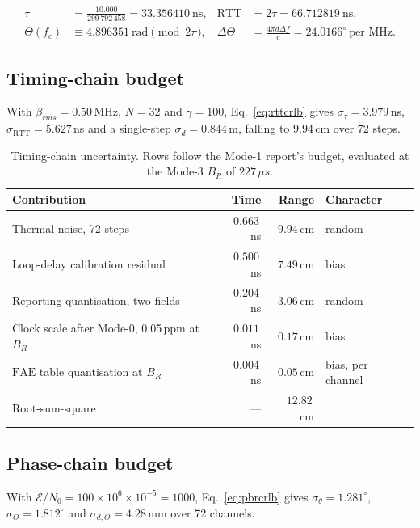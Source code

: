 \documentclass[11pt,a4paper]{article}
\newcommand{\us}{\,\ensuremath{\upmu}s}
\newcommand{\FAE}{\mathrm{FAE}}
\newcommand{\RTT}{\mathrm{RTT}}
\providecommand{\upmu}{\mu}
\begin{document}
\begin{align}
\tau &= \frac{10.000}{299\,792\,458} = 33.356410\ \text{ns}, &
\RTT &= 2\tau = 66.712819\ \text{ns}, \\
\Theta(f_c) &\equiv 4.896351\ \text{rad} \pmod{2\pi}, &
\Delta\Theta &= \frac{4\pi d \Delta f}{c} = 24.0166^{\circ}\ \text{per MHz}.
\end{align}

\subsection{Timing-chain budget}

With $\beta_{rms}=0.50$\,MHz, $N=32$ and $\gamma=100$, Eq.~\eqref{eq:rttcrlb} gives
$\sigma_\tau = 3.979$\,ns, $\sigma_{\RTT}=5.627$\,ns and a single-step $\sigma_d = 0.844$\,m,
falling to $9.94$\,cm over 72 steps.

\begin{table}[h]
\caption{Timing-chain uncertainty. Rows follow the Mode-1 report's budget, evaluated at the Mode-3
$B_R$ of $227\us$.}
\label{tab:budgetrtt}
\centering\small
\begin{tabular}{@{}L{54mm}rrL{26mm}@{}}
\toprule
Contribution & Time & Range & Character \\
\midrule
Thermal noise, 72 steps            & $0.663$\,ns & $9.94$\,cm & random \\
Loop-delay calibration residual    & $0.500$\,ns & $7.49$\,cm & bias \\
Reporting quantisation, two fields & $0.204$\,ns & $3.06$\,cm & random \\
Clock scale after Mode-0, 0.05\,ppm at $B_R$ & $0.011$\,ns & $0.17$\,cm & bias \\
$\FAE$ table quantisation at $B_R$ & $0.004$\,ns & $0.05$\,cm & bias, per channel \\
\midrule
Root-sum-square                    & --- & $12.82$\,cm & \\
\bottomrule
\end{tabular}
\end{table}

\subsection{Phase-chain budget}

With $\mathcal{E}/N_0 = 100\times10^{6}\times10^{-5}=1000$, Eq.~\eqref{eq:pbrcrlb} gives
$\sigma_\theta = 1.281^{\circ}$, $\sigma_\Theta = 1.812^{\circ}$ and $\sigma_{d,\Theta}=4.28$\,mm
over 72 channels.
\end{document}
